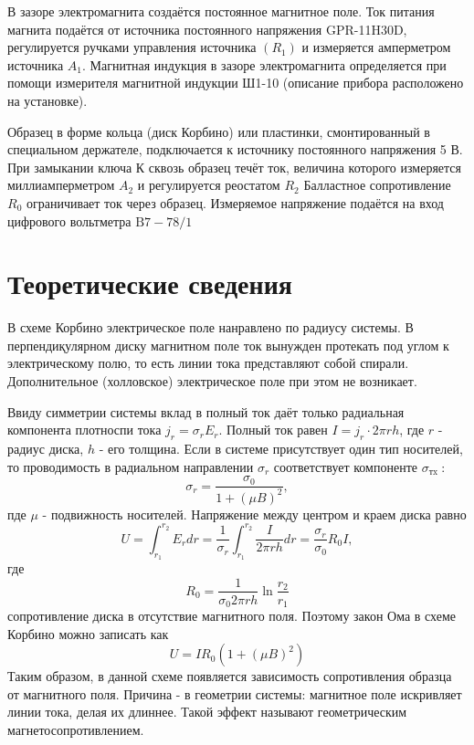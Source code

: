 \documentclass[a4paper, 12pt]{article}
\begin{document}
В зазоре электромагнита создаётся постоянное магнитное поле. Ток питания магнита подаётся от источника постоянного напряжения GPR-11H30D, регулируется ручками управления источника $\left(R_{1}\right)$ и измеряется амперметром источника $A_{1}$. Магнитная индукция в зазоре электромагнита определяется при помощи измерителя магнитной индукции Ш1-10 (описание прибора расположено на установке).

Образец в форме кольца (диск Корбино) или пластинки, смонтированный в специальном держателе, подключается к источнику постоянного напряжения 5 В. При замыкании ключа К сквозь образец течёт ток, величина которого измеряется миллиамперметром $A_{2}$ и регулируется реостатом $R_{2}$ Балластное сопротивление $R_{0}$ ограничивает ток через образец. Измеряемое напряжение подаётся на вход цифрового вольтметра $\mathrm{B} 7-78 / 1$

\section{Теоретические сведения}
В схеме Корбино электрическое поле нанравлено по радиусу системы. В перпендиқулярном диску магнитном поле ток вынужден протекать под углом к электрическому полю, то есть линии тока представляют собой спирали. Дополнительное (холловское) электрическое поле при этом не возникает.

Ввиду симметрии системы вклад в полный ток даёт только радиальная компонента плотноспи тока $j_r=\sigma_r E_r$. Полный ток равен $I=j_r \cdot 2 \pi r h$, где $r$ - радиус диска, $h$ - его толщина. Если в системе присутствует один тип носителей, то проводимость в радиальном направлении $\sigma_r$ соответствует компоненте $\sigma_{\text {тx }}$:
\begin{equation}
\sigma_r=\frac{\sigma_0}{1+(\mu B)^2},
\end{equation}
пде $\mu$ - подвижность носителей.
Напряжение между центром и краем диска равно
\begin{equation}
U=\int_{r_1}^{r_2} E_r d r=\frac{1}{\sigma_r} \int_{r_1}^{r_2} \frac{I}{2 \pi r h} d r=\frac{\sigma_r}{\sigma_0} R_0 I,
\end{equation}
где 
\begin{equation}
	R_0=\frac{1}{\sigma_0 2 \pi r h} \ln \frac{r_2}{r_1}
	\label{R_0}
\end{equation}
сопротивление диска в отсутствие магнитного поля. Поэтому закон Ома в схеме Корбино можно записать как
\begin{equation}
U=I R_0\left(1+(\mu B)^2\right)
\label{mu}
\end{equation}
Таким образом, в данной схеме появляется зависимость сопротивления образца от магнитного поля. Причина - в геометрии системы: магнитное поле искривляет линии тока, делая их длиннее. Такой эффект называют геометрическим магнетосопротивлением.
\end{document}
